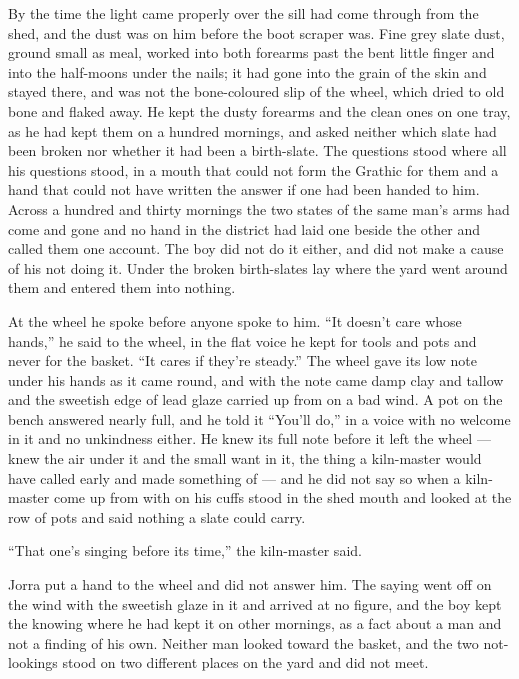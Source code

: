 By the time the light came properly over the sill  had come through from the shed, and the dust was on him before the boot scraper was. Fine grey slate dust, ground small as meal, worked into both forearms past the bent little finger and into the half-moons under the nails; it had gone into the grain of the skin and stayed there, and was not the bone-coloured slip of the wheel, which dried to old bone and flaked away. He kept the dusty forearms and the clean ones on one tray, as he had kept them on a hundred mornings, and asked neither which slate had been broken nor whether it had been a birth-slate. The questions stood where all his questions stood, in a mouth that could not form the Grathic for them and a hand that could not have written the answer if one had been handed to him. Across a hundred and thirty mornings the two states of the same man's arms had come and gone and no hand in the district had laid one beside the other and called them one account. The boy did not do it either, and did not make a cause of his not doing it. Under  the broken birth-slates lay where the yard went around them and entered them into nothing.

At the wheel he spoke before anyone spoke to him. “It doesn't care whose hands,” he said to the wheel, in the flat voice he kept for tools and pots and never for the basket. “It cares if they're steady.” The wheel gave its low note under his hands as it came round, and with the note came damp clay and tallow and the sweetish edge of lead glaze carried up from  on a bad wind. A pot on the bench answered nearly full, and he told it “You'll do,” in a voice with no welcome in it and no unkindness either. He knew its full note before it left the wheel --- knew the air under it and the small want in it, the thing a kiln-master would have called early and made something of --- and he did not say so when a kiln-master come up from  with  on his cuffs stood in the shed mouth and looked at the row of pots and said nothing a slate could carry.

“That one's singing before its time,” the kiln-master said.

Jorra put a hand to the wheel and did not answer him. The saying went off on the wind with the sweetish glaze in it and arrived at no figure, and the boy kept the knowing where he had kept it on other mornings, as a fact about a man and not a finding of his own. Neither man looked toward the basket, and the two not-lookings stood on two different places on the yard and did not meet.

